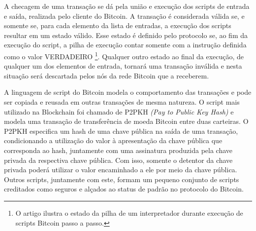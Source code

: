 \documentclass[a4paper,11pt]{article}
\newcommand{\link}[2]{{\color{blue}\underline{\href{#1}{#2}}}}
\begin{document}
A checagem de uma transação se dá pela união e execução dos scripts de entrada e saída, realizada pelo cliente do Bitcoin. A transação é considerada válida se, e somente se, para cada elemento da lista de entradas, a execução dos scripts resultar em um estado válido. Esse estado é definido pelo protocolo se, ao fim da execução do script, a pilha de execução contar somente com a instrução definida como o valor VERDADEIRO
\footnote{O artigo \cite{Bistarelli2019} ilustra o estado da pilha de um interpretador durante execução de scripts Bitcoin passo a passo.}.
Qualquer outro estado ao final da execução, de qualquer um dos elementos de entrada, tornará uma transação inválida e nesta situação será descartada pelos nós da rede Bitcoin que a receberem.

A linguagem de script do Bitcoin modela o comportamento das transações e pode ser copiada e reusada em outras transações de mesma natureza.
O script mais utilizado na Blockchain foi chamado de P2PKH \emph{(Pay to Public Key Hash)} e modela uma transação de transferência de moeda Bitcoin entre duas carteiras.
O P2PKH especifica um hash de uma chave pública na saída de uma transação, condicionando a utilização do valor à apresentação da chave pública que corresponda ao hash, juntamente com uma assinatura produzida pela chave privada da respectiva chave pública. Com isso, somente o detentor da chave privada poderá utilizar o valor encaminhado a ele por meio da chave pública.
Outros scripts, juntamente com este, formam um pequeno conjunto de scripts creditados como seguros e alçados ao status de padrão no protocolo do Bitcoin.

\end{document}
